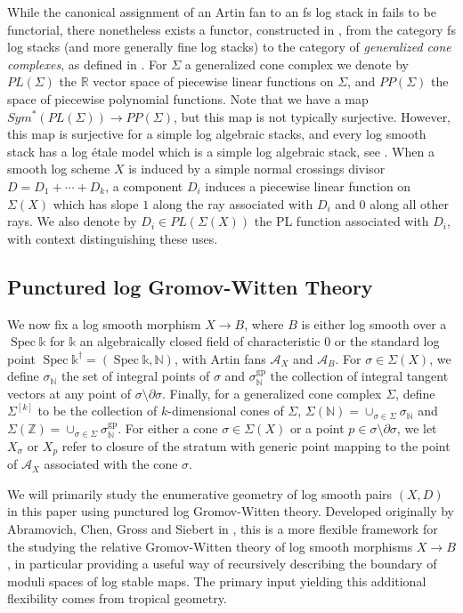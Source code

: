 \documentclass[12pt, oneside]{amsart}   	%
\newcommand{\NN}{\mathbb{N}}
\newcommand{\ZZ}{\mathbb{Z}}
\newcommand{\kk}{\mathds{k}}
\newcommand{\Spec}{\operatorname{Spec}}
\newcommand{\gp}{\operatorname{gp}}
\numberwithin{equation}{section}
\numberwithin{thm}{section}
\numberwithin{figure}{section}
\begin{document}
While the canonical assignment of an Artin fan to an fs log stack in \cite[Proposition $3.2.1$]{bound} fails to be functorial, there nonetheless exists a functor, constructed in \cite[Appendix $C$]{punc}, from the category fs log stacks (and more generally fine log stacks) to the category of \emph{generalized cone complexes}, as defined in \cite[$\S 2.2$]{ACP}. For $\Sigma$ a generalized cone complex we denote by $PL(\Sigma)$ the $\mathbb{R}$ vector space of piecewise linear functions on $\Sigma$, and $PP(\Sigma)$ the space of piecewise polynomial functions. Note that we have a map $Sym^*(PL(\Sigma)) \rightarrow PP(\Sigma)$, but this map is not typically surjective. However, this map is surjective for a simple log algebraic stacks, and every log smooth stack has a log \'etale model which is a simple log algebraic stack, see \cite[Lemma $3.6$]{intDR}. When a smooth log scheme $X$ is induced by a simple normal crossings divisor $D = D_1+\cdots+D_k$, a component $D_i$ induces a piecewise linear function on $\Sigma(X)$ which has slope $1$ along the ray associated with $D_i$ and $0$ along all other rays. We also denote by $D_i \in PL(\Sigma(X))$ the PL function associated with $D_i$, with context distinguishing these uses. 


\subsection{Punctured log Gromov-Witten Theory}
We now fix a log smooth morphism $X \rightarrow B$, where $B$ is either log smooth over a $\Spec\kk$ for $\kk$ an algebraically closed field of characteristic $0$ or the standard log point $\Spec \kk^{\dagger} = (\Spec\kk,\NN)$, with Artin fans $\mathcal{A}_X$ and $\mathcal{A}_B$. For $\sigma \in \Sigma(X)$, we define $\sigma_{\NN}$ the set of integral points of $\sigma$ and $\sigma_{\NN}^{\gp}$ the collection of integral tangent vectors at any point of $\sigma \setminus \partial \sigma$. Finally, for a generalized cone complex $\Sigma$, define $\Sigma^{[k]}$ to be the collection of $k$-dimensional cones of $\Sigma$, $\Sigma(\NN) = \cup_{\sigma\in \Sigma} \sigma_{\NN}$ and $\Sigma(\ZZ) = \cup_{\sigma \in \Sigma} \sigma_{\NN}^{\gp}$. For either a cone $\sigma \in \Sigma(X)$ or a point $p \in \sigma\setminus \partial \sigma$, we let $X_{\sigma}$ or $X_p$ refer to closure of the stratum with generic point mapping to the point of $\mathcal{A}_X$ associated with the cone $\sigma$. 

We will primarily study the enumerative geometry of log smooth pairs $(X,D)$ in this paper using punctured log Gromov-Witten theory. Developed originally by Abramovich, Chen, Gross and Siebert in \cite{punc}, this is a more flexible framework for the studying the relative Gromov-Witten theory of log smooth morphisms $X \rightarrow B$, in particular providing a useful way of recursively describing the boundary of moduli spaces of log stable maps. The primary input yielding this additional flexibility comes from tropical geometry.
\end{document}
